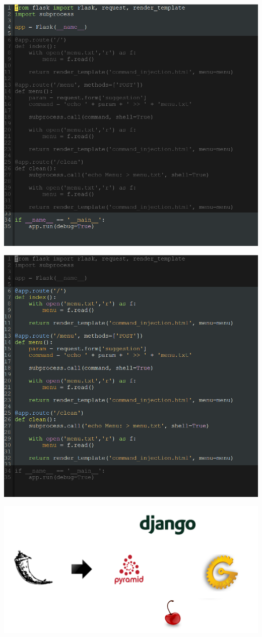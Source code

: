 \begin{frame}
  \includegraphics[height=0.8\textheight]{graphics/adaptor_module}
\end{frame}

\begin{frame}
  \includegraphics[height=0.8\textheight]{graphics/adaptor_flask}
\end{frame}

\begin{frame}
  \center
  \includegraphics[width=\textwidth]{graphics/adaptor}
\end{frame}
